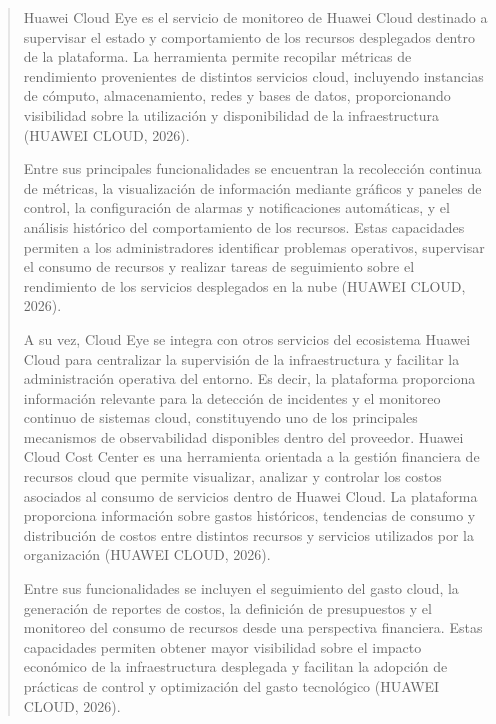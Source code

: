 \documentclass[
]{article}
\begin{document}
\begin{quote}
Huawei Cloud Eye es el servicio de monitoreo de Huawei Cloud destinado a
supervisar el estado y comportamiento de los recursos desplegados dentro
de la plataforma. La herramienta permite recopilar métricas de
rendimiento provenientes de distintos servicios cloud, incluyendo
instancias de cómputo, almacenamiento, redes y bases de datos,
proporcionando visibilidad sobre la utilización y disponibilidad de la
infraestructura (HUAWEI CLOUD, 2026).

Entre sus principales funcionalidades se encuentran la recolección
continua de métricas, la visualización de información mediante gráficos
y paneles de control, la configuración de alarmas y notificaciones
automáticas, y el análisis histórico del comportamiento de los recursos.
Estas capacidades permiten a los administradores identificar problemas
operativos, supervisar el consumo de recursos y realizar tareas de
seguimiento sobre el rendimiento de los servicios desplegados en la nube
(HUAWEI CLOUD, 2026).

A su vez, Cloud Eye se integra con otros servicios del ecosistema Huawei
Cloud para centralizar la supervisión de la infraestructura y facilitar
la administración operativa del entorno. Es decir, la plataforma
proporciona información relevante para la detección de incidentes y el
monitoreo continuo de sistemas cloud, constituyendo uno de los
principales mecanismos de observabilidad disponibles dentro del
proveedor. Huawei Cloud Cost Center es una herramienta orientada a la
gestión financiera de recursos cloud que permite visualizar, analizar y
controlar los costos asociados al consumo de servicios dentro de Huawei
Cloud. La plataforma proporciona información sobre gastos históricos,
tendencias de consumo y distribución de costos entre distintos recursos
y servicios utilizados por la organización (HUAWEI CLOUD, 2026).

Entre sus funcionalidades se incluyen el seguimiento del gasto cloud, la
generación de reportes de costos, la definición de presupuestos y el
monitoreo del consumo de recursos desde una perspectiva financiera.
Estas capacidades permiten obtener mayor visibilidad sobre el impacto
económico de la infraestructura desplegada y facilitan la adopción de
prácticas de control y optimización del gasto tecnológico (HUAWEI CLOUD,
2026).


\end{quote}
\end{document}
